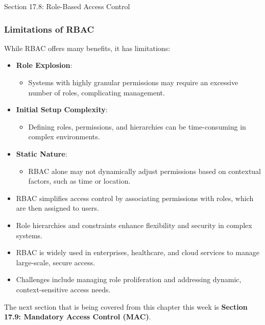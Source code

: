 \begin{notes}{Section 17.8: Role-Based Access Control}
    \subsubsection*{Limitations of RBAC}
    
    While RBAC offers many benefits, it has limitations:
    \begin{itemize}
        \item \textbf{Role Explosion}:
        \begin{itemize}
            \item Systems with highly granular permissions may require an excessive number of roles, complicating management.
        \end{itemize}
        \item \textbf{Initial Setup Complexity}:
        \begin{itemize}
            \item Defining roles, permissions, and hierarchies can be time-consuming in complex environments.
        \end{itemize}
        \item \textbf{Static Nature}:
        \begin{itemize}
            \item RBAC alone may not dynamically adjust permissions based on contextual factors, such as time or location.
        \end{itemize}
    \end{itemize}
    
    \begin{highlight}
        \begin{itemize}
            \item RBAC simplifies access control by associating permissions with roles, which are then assigned to users.
            \item Role hierarchies and constraints enhance flexibility and security in complex systems.
            \item RBAC is widely used in enterprises, healthcare, and cloud services to manage large-scale, secure access.
            \item Challenges include managing role proliferation and addressing dynamic, context-sensitive access needs.
        \end{itemize}
    \end{highlight}
\end{notes}

The next section that is being covered from this chapter this week is \textbf{Section 17.9: Mandatory Access Control (MAC)}.

